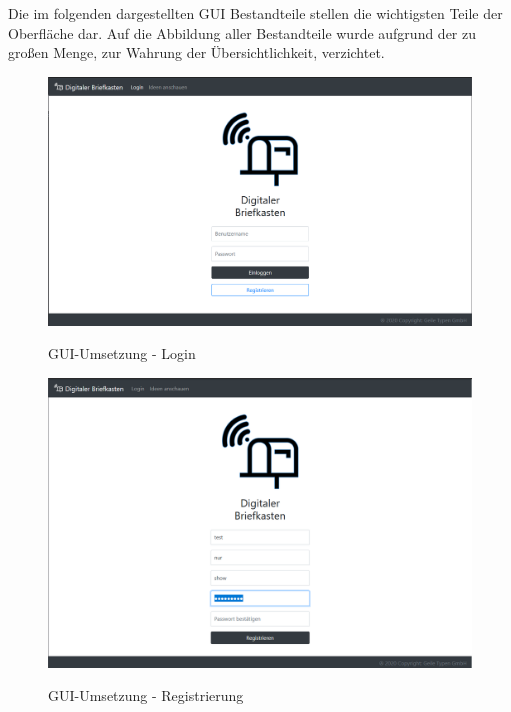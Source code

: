 Die im folgenden dargestellten GUI Bestandteile stellen die wichtigsten Teile der Oberfläche dar. Auf die Abbildung aller Bestandteile wurde aufgrund der zu großen Menge, zur Wahrung der Übersichtlichkeit, verzichtet.

\begin{figure}[h]
\centering
\begin{minipage}[t]{1\textwidth} 
\caption{GUI-Umsetzung - Login } 
\includegraphics[width=1\textwidth]{img/login-umsetzung.png}\\
\end{minipage}
\end{figure}

\begin{figure}[h]
\centering
\begin{minipage}[t]{1\textwidth} 
\caption{GUI-Umsetzung - Registrierung } 
\includegraphics[width=1\textwidth]{img/registrierung-umsetzung.png}\\
\end{minipage}
\end{figure}

